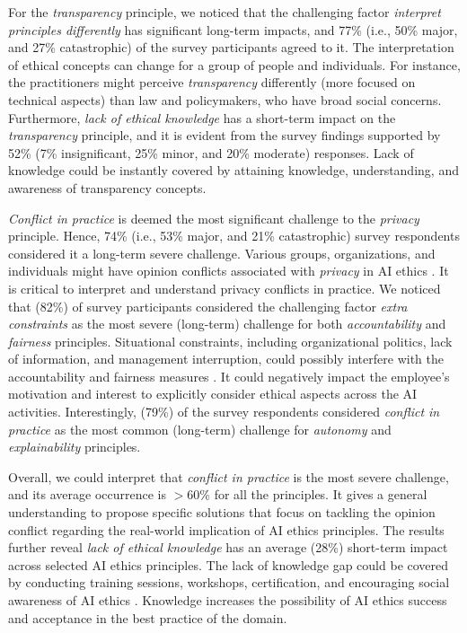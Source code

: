 For the \textit{transparency} principle, we noticed that the challenging factor \textit{interpret principles differently} has significant long-term impacts, and 77\% (i.e., 50\% major, and 27\% catastrophic) of the survey participants agreed to it. The interpretation of ethical concepts can change for a group of people and individuals. For instance, the practitioners might perceive \textit{transparency} differently (more focused on technical aspects) than law and policymakers, who have broad social concerns. Furthermore, \textit{lack of ethical knowledge} has a short-term impact on the \textit{transparency} principle, and it is evident from the survey findings supported by 52\% (7\% insignificant, 25\% minor, and 20\% moderate) responses. Lack of knowledge could be instantly covered by attaining knowledge, understanding, and awareness of transparency concepts. 

\textit{Conflict in practice} is deemed the most significant challenge to the \textit{privacy} principle. Hence, 74\% (i.e., 53\% major, and 21\% catastrophic) survey respondents considered it a long-term severe challenge. Various groups, organizations, and individuals might have opinion conflicts associated with \textit{privacy} in AI ethics \cite{stahl2018ethics}. It is critical to interpret and understand privacy conflicts in practice. We noticed that (82\%) of survey participants considered the challenging factor \textit{extra constraints} as the most severe (long-term) challenge for both \textit{accountability} and \textit{fairness} principles. Situational constraints, including organizational politics, lack of information, and management interruption, could possibly interfere with the accountability and fairness measures \cite{krijger2021enter}. It could negatively impact the employee’s motivation and interest to explicitly consider ethical aspects across the AI activities. Interestingly, (79\%) of the survey respondents considered \textit{conflict in practice} as the most common (long-term) challenge for \textit{autonomy} and \textit{explainability} principles.

Overall, we could interpret that \textit{conflict in practice}  is the most severe challenge, and its average occurrence is $>$60\% for all the principles. It gives a general understanding to propose specific solutions that focus on tackling the opinion conflict regarding the real-world implication of AI ethics principles. The results further reveal \textit{lack of ethical knowledge} has an average (28\%) short-term impact across selected AI ethics principles. The lack of knowledge gap could be covered by conducting training sessions, workshops, certification, and encouraging social awareness of AI ethics \cite{AR13}. Knowledge increases the possibility of AI ethics success and acceptance in the best practice of the domain. 

